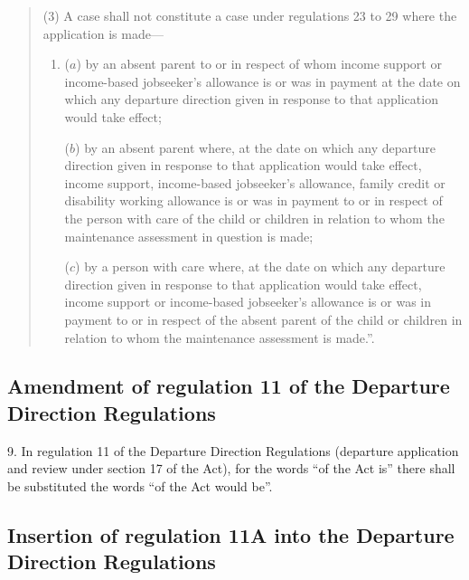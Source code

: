 \documentclass[12pt,a4paper]{article}
\begin{document}
\begin{quotation}
(3) A case shall not constitute a case under regulations 23 to 29 where the application is made—
\begin{enumerate}\item[]
($a$) by an absent parent to or in respect of whom income support or income-based jobseeker’s allowance is or was in payment at the date on which any departure direction given in response to that application would take effect;

($b$) by an absent parent where, at the date on which any departure direction given in response to that application would take effect, income support, income-based jobseeker’s allowance, family credit or disability working allowance is or was in payment to or in respect of the person with care of the child or children in relation to whom the maintenance assessment in question is made;

($c$) by a person with care where, at the date on which any departure direction given in response to that application would take effect, income support or income-based jobseeker’s allowance is or was in payment to or in respect of the absent parent of the child or children in relation to whom the maintenance assessment is made.”.
\end{enumerate}
\end{quotation}

\subsection[9. Amendment of regulation 11 of the Departure Direction Regulations]{Amendment of regulation 11 of the Departure Direction Regulations}

9.  In regulation 11 of the Departure Direction Regulations (departure application and review under section 17 of the Act), for the words “of the Act is” there shall be substituted the words “of the Act would be”.

\subsection[10. Insertion of regulation 11A into the Departure Direction Regulations]{Insertion of regulation 11A into the Departure Direction Regulations}
\end{document}
